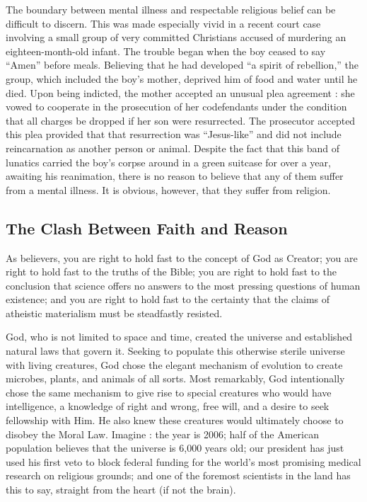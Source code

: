 \documentclass[a4paper,14pt]{extarticle}
\begin{document}
The boundary between mental illness and respectable religious belief can be difficult to discern.
This was made especially vivid in a recent court case involving a small group of very committed Christians accused of murdering an eighteen-month-old infant.
The trouble began when the boy ceased to say ``Amen'' before meals.
Believing that he had developed ``a spirit of rebellion,'' the group, which included the boy’s mother, deprived him of food and water until he died.
Upon being indicted, the mother accepted an unusual plea agreement :
she vowed to cooperate in the prosecution of her codefendants under the condition that all charges be dropped if her son were resurrected.
The prosecutor accepted this plea provided that that resurrection was ``Jesus-like'' and did not include reincarnation as another person or animal.
Despite the fact that this band of lunatics carried the boy’s corpse around in a green suitcase for over a year, awaiting his reanimation, there is no reason to believe that any of them suffer from a mental illness.
It is obvious, however, that they suffer from religion.

\subsection{The Clash Between Faith and Reason}

As believers, you are right to hold fast to the concept of God as Creator;
you are right to hold fast to the truths of the Bible;
you are right to hold fast to the conclusion that science offers no answers to the most pressing questions of human existence;
and you are right to hold fast to the certainty that the claims of atheistic materialism must be steadfastly resisted.

God, who is not limited to space and time, created the universe and established natural laws that govern it.
Seeking to populate this otherwise sterile universe with living creatures, God chose the elegant mechanism of evolution to create microbes, plants, and animals of all sorts.
Most remarkably, God intentionally chose the same mechanism to give rise to special creatures who would have intelligence, a knowledge of right and wrong, free will, and a desire to seek fellowship with Him.
He also knew these creatures would ultimately choose to disobey the Moral Law.
Imagine :
the year is 2006;
half of the American population believes that the universe is 6,000 years old;
our president has just used his first veto to block federal funding for the world’s most promising medical research on religious grounds;
and one of the foremost scientists in the land has this to say, straight from the heart (if not the brain).
\end{document}
